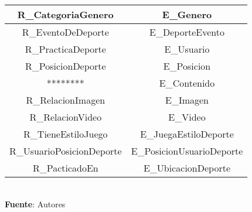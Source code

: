 \begin{table}[!htb]
\begin{center}
{\begin{tabular}{|p{4cm}|p{4cm}|p{4cm}|p{4cm}|}
			\hline
			\multicolumn{2}{|c|}{R\_CategoriaGenero} & 
			\multicolumn{2}{c|}{E\_Genero} \\
			\hline
			\multicolumn{2}{|c|}{R\_EventoDeDeporte} & 
			\multicolumn{2}{c|}{E\_DeporteEvento} \\
			\hline
			\multicolumn{2}{|c|}{R\_PracticaDeporte} & 
			\multicolumn{2}{c|}{E\_Usuario} \\
			\hline
			\multicolumn{2}{|c|}{R\_PosicionDeporte} & 
			\multicolumn{2}{c|}{E\_Posicion} \\
			\hline
			\multicolumn{2}{|c|}{********} & 
			\multicolumn{2}{c|}{E\_Contenido} \\
			\hline
			\multicolumn{2}{|c|}{R\_RelacionImagen} & 
			\multicolumn{2}{c|}{E\_Imagen} \\
			\hline
			\multicolumn{2}{|c|}{R\_RelacionVideo} & 
			\multicolumn{2}{c|}{E\_Video} \\
			\hline
			\multicolumn{2}{|c|}{R\_TieneEstiloJuego} & 
			\multicolumn{2}{c|}{E\_JuegaEstiloDeporte} \\
			\hline
			\multicolumn{2}{|c|}{R\_UsuarioPosicionDeporte} & 
			\multicolumn{2}{c|}{E\_PosicionUsuarioDeporte} \\
			\hline
			\multicolumn{2}{|c|}{R\_PacticadoEn} & 
			\multicolumn{2}{c|}{E\_UbicacionDeporte} \\
			\hline
		\end{tabular}
		} \\
		\textbf{Fuente}: Autores
	\end{center}
\end{table}